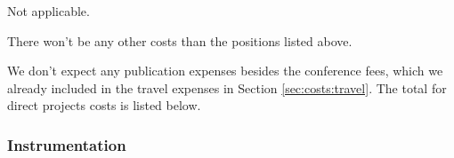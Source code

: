 \documentclass{scrartcl}
\begin{document}


\label{sec:costs:travel}






Not applicable. 


There won't be any other costs than the positions listed above. 


We don't expect any publication expenses besides the conference fees, which we already included in the travel expenses in Section \ref{sec:costs:travel}. The total for direct projects costs is listed below. 


\subsubsection{Instrumentation}
\end{document}
